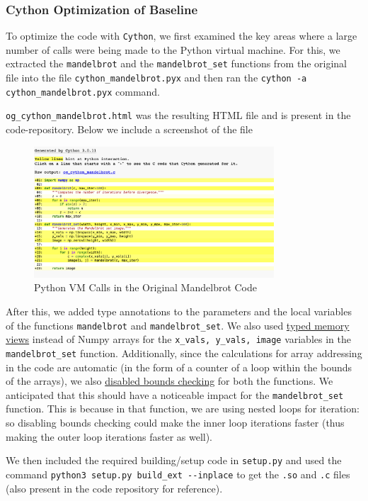 \documentclass[a4paper,12pt]{article}
\begin{document}
\subsubsection{Cython Optimization of Baseline}
To optimize the code with \verb|Cython|, we first examined the key areas where a large number of calls were being made to the Python virtual machine. For this, we extracted the \verb|mandelbrot| and the \verb|mandelbrot_set| functions from the original file into the file \verb|cython_mandelbrot.pyx| and then ran the \verb|cython -a cython_mandelbrot.pyx| command. 

\verb|og_cython_mandelbrot.html| was the resulting HTML file and is present in the code-repository. Below we include a screenshot of the file

\begin{figure}[H]
  \centering
  \includegraphics[width=0.8\textwidth]{images/og_mandelbrot_cython.png}
  \caption{Python VM Calls in the Original Mandelbrot Code}
\end{figure}

After this, we added type annotations to the parameters and the local variables of the functions \verb|mandelbrot| and \verb|mandelbrot_set|. We also used \underline{typed memory views} instead of Numpy arrays for the \verb|x_vals, y_vals, image| variables in the \verb|mandelbrot_set| function. Additionally, since the calculations for array addressing in the code are automatic (in the form of a counter of a loop within the bounds of the arrays), we also \underline{disabled bounds checking} for both the functions. We anticipated that this should have a noticeable impact for the \verb|mandelbrot_set| function. This is because in that function, we are using nested loops for iteration: so disabling bounds checking could make the inner loop iterations faster (thus making the outer loop iterations faster as well). 

We then included the required building/setup code in \verb|setup.py| and used the command \verb|python3 setup.py build_ext --inplace| to get the \verb|.so| and \verb|.c| files (also present in the code repository for reference). 
\end{document}
